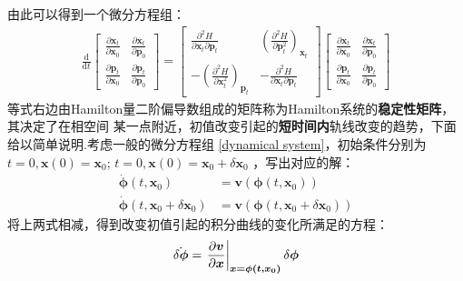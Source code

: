     由此可以得到一个微分方程组：
    \begin{equation}
        \displaystyle
        \begin{split}
            \frac {\mathrm{d}}{\mathrm{d}t}
            \begin{bmatrix}
                \frac {\partial \bm{x}_t}{\partial \bm{x}_0} & \frac {\partial \bm{x}_t}{\partial \bm{p}_0}\\
                \frac {\partial \bm{p}_t}{\partial \bm{x}_0} & \frac {\partial \bm{p}_t}{\partial \bm{p}_0}
            \end{bmatrix}
            =
            \begin{bmatrix}
                \frac {\partial^2 H}{\partial \bm{x}_t \partial \bm{p}_t} & (\frac {\partial^2 H}{\partial \bm{p}_t^2})_{\bm{x}_t}\\
                -(\frac {\partial^2 H}{\partial \bm{x}_t^2})_{\bm{p}_t} & - \frac {\partial^2 H}{\partial \bm{x}_t \partial \bm{p}_t}
            \end{bmatrix}
            \begin{bmatrix}
                \frac {\partial \bm{x}_t}{\partial \bm{x}_0} & \frac {\partial \bm{x}_t}{\partial \bm{p}_0}\\
                \frac {\partial \bm{p}_t}{\partial \bm{x}_0} & \frac {\partial \bm{p}_t}{\partial \bm{p}_0}
            \end{bmatrix}
        \end{split}
    \end{equation}
    等式右边由Hamilton量二阶偏导数组成的矩阵称为Hamilton系统的\textbf{稳定性矩阵}，其决定了在相空间
    某一点附近，初值改变引起的\textbf{短时间内}轨线改变的趋势，下面给以简单说明.考虑一般的微分方程组
    \ref{dynamical system}，初始条件分别为$t=0, \bm{x}(0) = \bm{x}_0;\, t=0, \bm{x}(0) = \bm{x}_0 + \delta\bm{x}_0$
    ，写出对应的解：
    \begin{equation}
        \begin{split}
            \dot{\bm{\phi}}(t, \bm{x}_0) &= \bm{v}(\bm{\phi}(t, \bm{x}_0))\\
            \dot{\bm{\phi}}(t, \bm{x}_0 + \delta\bm{x}_0) &= \bm{v}(\bm{\phi}(t, \bm{x}_0 + \delta\bm{x}_0))
        \end{split}
    \end{equation}
    将上两式相减，得到改变初值引起的积分曲线的变化所满足的方程：
    \begin{equation}
        \dot{\delta\bm{\phi}} = \left.\frac{\partial{\bm{v}}}{\partial{\bm{x}}}\right|_{\bm{x = \bm{\phi(t, \bm{x}_0)}}} \delta\bm{\phi}
    \end{equation}
